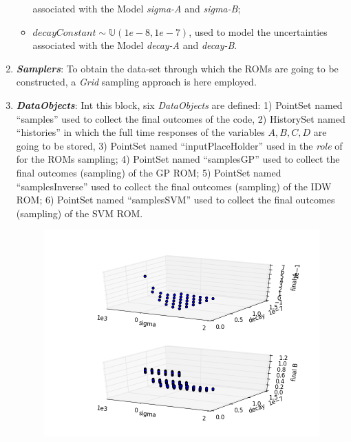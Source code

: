 \begin{enumerate}
\begin{itemize}
    associated with  the Model \textit{sigma-A} and \textit{sigma-B};
    \item  $decayConstant \sim \mathbb{U}(1e-8,1e-7)$,  used to
    model the uncertainties
    associated with  the Model \textit{decay-A} and \textit{decay-B}.
  \end{itemize}
   \item \textbf{\textit{Samplers}}:
  To obtain the data-set through which the ROMs are going to be
  constructed, a \textit{Grid} sampling approach is here employed.
   \item \textbf{\textit{DataObjects}}:
  Int this block, six \textit{DataObjects} are defined: 1) PointSet
  named ``samples'' used to collect the final outcomes of the code, 2)
  HistorySet named ``histories'' in which the full time responses of the
  variables $A,B,C,D$ are going to be stored, 3) PointSet named
  ``inputPlaceHolder'' used in the \textit{role} of  for the ROMs sampling;
  4) PointSet named ``samplesGP'' used to collect the final outcomes (sampling) of the GP ROM;
  5) PointSet named ``samplesInverse'' used to collect the final outcomes (sampling) of the IDW ROM;
  6) PointSet named ``samplesSVM'' used to collect the final outcomes (sampling) of the SVM ROM.
 \begin{figure}[h!]
  \centering
  \includegraphics[scale=0.7]{../../tests/framework/user_guide/ReducedOrderModeling/gold/ROMConstruction/1-samplesPlot3D_scatter-scatter.png}

\end{figure}
\end{enumerate}
